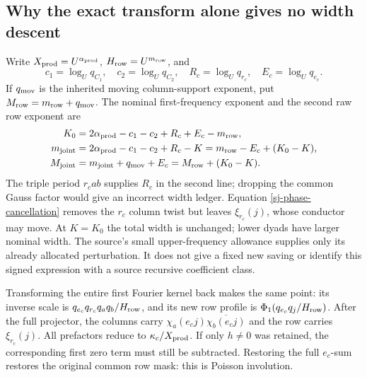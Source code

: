 \documentclass[11pt]{article}
\theoremstyle{definition}
\begin{document}
\subsection{Why the exact transform alone gives no width descent}
Write $X_{\rm prod}=U^{\alpha_{\rm prod}}$,
$H_{\rm row}=U^{m_{\rm row}}$, and
\[
 c_1=\log_Uq_{C_1},\quad c_2=\log_Uq_{C_2},\quad
 R_c=\log_Uq_{r_c},\quad E_c=\log_Uq_{e_c}.
\]
If $q_{\rm mov}$ is the inherited moving column-support exponent, put
$M_{\rm row}=m_{\rm row}+q_{\rm mov}$.  The nominal first-frequency
exponent and the second raw row exponent are
\begin{align}\label{sj-width-ledger}
 K_0&=2\alpha_{\rm prod}-c_1-c_2+R_c+E_c-m_{\rm row},\notag\\
 m_{\rm joint}&=2\alpha_{\rm prod}-c_1-c_2+R_c-K
              =m_{\rm row}-E_c+(K_0-K),\notag\\
 M_{\rm joint}&=m_{\rm joint}+q_{\rm mov}+E_c
              =M_{\rm row}+(K_0-K).
\end{align}
The triple period $r_cab$ supplies $R_c$ in the second line; dropping
the common Gauss factor would give an incorrect width ledger.
Equation \eqref{sj-phase-cancellation} removes the $r_c$ column twist
but leaves $\xi_{r_c}(j)$, whose conductor may move.  At $K=K_0$ the
total width is unchanged; lower dyads have larger nominal width.
The source's small upper-frequency allowance supplies only its already
allocated perturbation.  It does not give a fixed new saving or identify
this signed expression with a source recursive coefficient class.

Transforming the entire first Fourier kernel back makes the same point:
its inverse scale is $q_{e_c}q_{r_c}q_aq_b/H_{\rm row}$, and its new
row profile is $\Phi_1(q_{e_c}q_j/H_{\rm row})$.  After the full
projector, the columns carry $\chi_a(e_cj)\overline{\chi_b(e_cj)}$ and
the row carries $\xi_{r_c}(j)$.  All prefactors reduce to
$\kappa_c/X_{\rm prod}$.  If only $h\ne0$ was retained, the corresponding
first zero term must still be subtracted.  Restoring the full $e_c$-sum
restores the original common row mask: this is Poisson involution.
\end{document}
